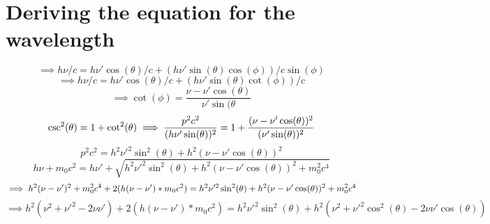 \documentclass{article}
\begin{document}
\section{Deriving the equation for the wavelength}

\begin{equation}
\implies h\nu /c = h\nu' \cos(\theta) / c + (h\nu' \sin(\theta)  \cos(\phi))/c\sin(\phi)
\end{equation}
\begin{equation}
\implies h\nu /c = h\nu' \cos(\theta) / c + (h\nu' \sin(\theta) \cot(\phi))/c
\end{equation}
\begin{equation}
\implies \cot(\phi) = \frac{\nu - \nu' \cos(\theta)}{\nu' \sin(\theta}
\end{equation}
\begin{equation}
   \csc^2 (\theta) = 1 + \cot^2(\theta) \\
\implies   \frac{p^2c^2}{(h\nu' \sin(\theta))^2} = 1 + \frac{(\nu - \nu' \cos(\theta))^2}{(\nu' \sin(\theta))^2}
\end{equation}
\begin{equation}
    p^2c^2 = h^2 \nu'^2 \sin^2(\theta) + h^2 (\nu - \nu'\cos(\theta))^2
\end{equation}
\begin{equation}
  h\nu + m_0c^2 = h\nu' + \sqrt{h^2 \nu'^2 \sin^2(\theta) + h^2 (\nu - \nu'\cos(\theta))^2 + m_0^2c^4}  
\end{equation}
\begin{equation}
\implies h^2(\nu - \nu')^2 + m_0^2c^4 + 2(h(\nu - \nu')*m_0c^2)= h^2 \nu'^2 \sin^2(\theta) + h^2 (\nu - \nu' \cos(\theta))^2 + m_0^2c^4 \\
\end{equation}
\begin{equation}
\implies h^2(\nu^2 + \nu'^2 -2\nu\nu') + 2(h(\nu-\nu')*m_0c^2) = h^2\nu'^2\sin^2(\theta) + h^2(\nu^2 + \nu'^2\cos^2(\theta) - 2\nu\nu'\cos(\theta))
\end{equation}
\end{document}
